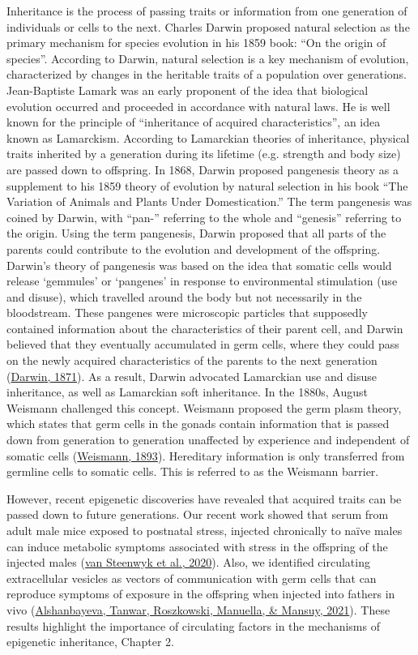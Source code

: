 \documentclass[12pt,twoside]{reedthesis}
\begin{document}
Inheritance is the process of passing traits or information from one
generation of individuals or cells to the next. Charles Darwin proposed
natural selection as the primary mechanism for species evolution in his
1859 book: ``On the origin of species''. According to Darwin, natural
selection is a key mechanism of evolution, characterized by changes in
the heritable traits of a population over generations. Jean-Baptiste
Lamark was an early proponent of the idea that biological evolution
occurred and proceeded in accordance with natural laws. He is well known
for the principle of ``inheritance of acquired characteristics'', an idea
known as Lamarckism. According to Lamarckian theories of inheritance,
physical traits inherited by a generation during its lifetime (e.g.
strength and body size) are passed down to offspring. In 1868, Darwin
proposed pangenesis theory as a supplement to his 1859 theory of
evolution by natural selection in his book ``The Variation of Animals and
Plants Under Domestication.'' The term pangenesis was coined by Darwin,
with ``pan-'' referring to the whole and ``genesis'' referring to the
origin. Using the term pangenesis, Darwin proposed that all parts of the
parents could contribute to the evolution and development of the
offspring. Darwin's theory of pangenesis was based on the idea that
somatic cells would release `gemmules' or `pangenes' in response to
environmental stimulation (use and disuse), which travelled around the
body but not necessarily in the bloodstream. These pangenes were
microscopic particles that supposedly contained information about the
characteristics of their parent cell, and Darwin believed that they
eventually accumulated in germ cells, where they could pass on the newly
acquired characteristics of the parents to the next generation
(\protect\hyperlink{ref-darwin1871}{Darwin, 1871}). As a result, Darwin advocated Lamarckian use and disuse
inheritance, as well as Lamarckian soft inheritance. In the 1880s,
August Weismann challenged this concept. Weismann proposed the germ
plasm theory, which states that germ cells in the gonads contain
information that is passed down from generation to generation unaffected
by experience and independent of somatic cells (\protect\hyperlink{ref-weismann1893}{Weismann, 1893}).
Hereditary information is only transferred from germline cells to
somatic cells. This is referred to as the Weismann barrier.

However, recent epigenetic discoveries have revealed that acquired
traits can be passed down to future generations. Our recent work showed
that serum from adult male mice exposed to postnatal stress, injected
chronically to naïve males can induce metabolic symptoms associated with
stress in the offspring of the injected males (\protect\hyperlink{ref-vansteenwyk2020}{van Steenwyk et al., 2020}). Also,
we identified circulating extracellular vesicles as vectors of
communication with germ cells that can reproduce symptoms of exposure in
the offspring when injected into fathers in vivo (\protect\hyperlink{ref-alshanbayeva2021}{Alshanbayeva, Tanwar, Roszkowski, Manuella, \& Mansuy, 2021}).
These results highlight the importance of circulating factors in the
mechanisms of epigenetic inheritance, Chapter 2.
\end{document}
